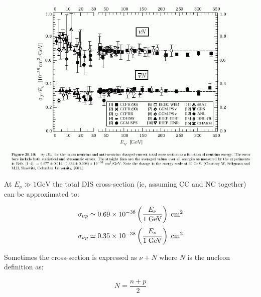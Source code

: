\documentclass[
  letterpaper,
  DIV=11,
  numbers=noendperiod]{scrreprt}
\begin{document}
\begin{center}
\includegraphics{images/pdg_plot.gif}
\end{center}

At \(E_\nu \gg 1 \mathrm{GeV}\) the total DIS cross-section (ie,
assuming CC and NC together) can be approximated to:

\[\sigma_{\nu p} \simeq 0.69 \times 10^{-38} \left(\frac{E_\nu}{ 1 \rm{\; GeV}}\right) \rm{ \; cm}^2\]
\[\sigma_{\bar{\nu} p} \simeq 0.35 \times 10^{-38}\left(\frac{E_\nu}{ 1 \rm{\; GeV}}\right) \rm{ \; cm}^2\]

Sometimes the cross-section is expressed as \(\nu + N\) where \(N\) is
the nucleon definition as:

\[N = \frac{n+p}{2}\]
\end{document}
